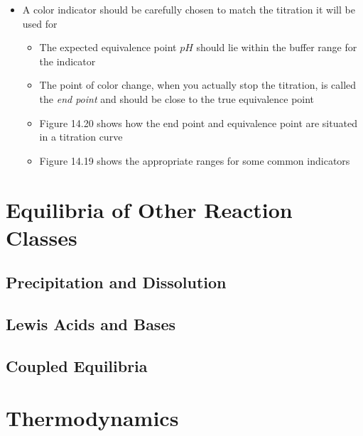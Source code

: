 \documentclass[12pt, openany, letterpaper]{memoir}
\begin{document}
\begin{itemize}
\begin{itemize}
    \item A color indicator should be carefully chosen to match the titration it will be used for
    \begin{itemize}
      \item The expected equivalence point $pH$ should lie within the buffer range for the indicator
      \item The point of color change, when you actually stop the titration, is called the \emph{end point} and should be close to the true equivalence point
      \item Figure 14.20 shows how the end point and equivalence point are situated in a titration curve
      \item Figure 14.19 shows the appropriate ranges for some common indicators
    \end{itemize}
  \end{itemize}
\end{itemize}

\chapter{Equilibria of Other Reaction Classes}

\section{Precipitation and Dissolution}

\section{Lewis Acids and Bases}

\section{Coupled Equilibria}

\chapter{Thermodynamics}
\end{document}
